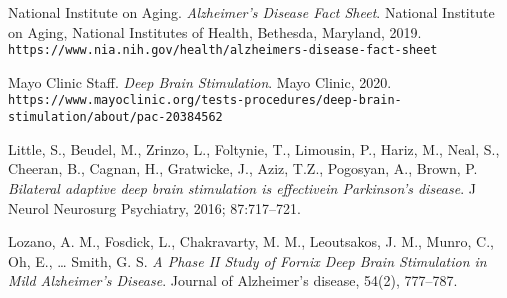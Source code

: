 \documentclass{article}
\begin{document}
\begin{thebibliography}{9}

National Institute on Aging. 
\textit{Alzheimer's Disease Fact Sheet}. 
National Institute on Aging, National Institutes of Health, Bethesda, Maryland, 2019.
\\\texttt{https://www.nia.nih.gov/health/alzheimers-disease-fact-sheet}

Mayo Clinic Staff. 
\textit{Deep Brain Stimulation}. 
Mayo Clinic, 2020.
\\\texttt{https://www.mayoclinic.org/tests-procedures/deep-brain-stimulation/about/pac-20384562}

Little, S., Beudel, M., Zrinzo, L., Foltynie, T., Limousin, P., Hariz, M., Neal, S., Cheeran, B., Cagnan, H., Gratwicke, J., Aziz, T.Z., Pogosyan, A., Brown, P. 
\textit{Bilateral adaptive deep brain stimulation is effectivein Parkinson’s disease}. 
J Neurol Neurosurg Psychiatry, 2016; 87:717–721.

Lozano, A. M., Fosdick, L., Chakravarty, M. M., Leoutsakos, J. M., Munro, C., Oh, E., … Smith, G. S. 
\textit{A Phase II Study of Fornix Deep Brain Stimulation in Mild Alzheimer’s Disease}. 
Journal of Alzheimer's disease, 54(2), 777–787. 

\end{thebibliography}
\end{document}
